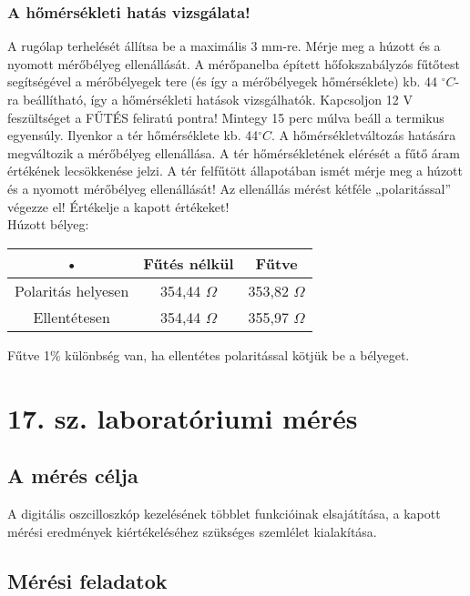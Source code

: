 \documentclass[10pt,a4paper]{article}
\begin{document}
	\subsubsection{A hőmérsékleti hatás vizsgálata!}
	A rugólap terhelését állítsa be a maximális 3 mm-re.
Mérje meg a húzott és a nyomott mérőbélyeg ellenállását.
A mérőpanelba épített hőfokszabályzós fűtőtest segítségével a mérőbélyegek tere (és így a
mérőbélyegek hőmérséklete) kb. 44 $^{\circ}C$-ra beállítható, így a hőmérsékleti hatások
vizsgálhatók.
Kapcsoljon 12 V feszültséget a FŰTÉS feliratú pontra!
Mintegy 15 perc múlva beáll a termikus egyensúly. Ilyenkor a tér hőmérséklete kb. 44$^{\circ}C$.
A hőmérsékletváltozás hatására megváltozik a mérőbélyeg ellenállása.
A tér hőmérsékletének elérését a fűtő áram értékének lecsökkenése jelzi.
A tér felfűtött állapotában ismét mérje meg a húzott és a nyomott mérőbélyeg ellenállását!
Az ellenállás mérést kétféle „polaritással” végezze el! Értékelje a kapott értékeket!
$$$$Húzott bélyeg:$$$$\begin{tabular}{|c|c|c|}
\hline 
• & Fűtés nélkül & Fűtve \\ 
\hline 
Polaritás helyesen & 354,44 $\Omega$ & 353,82 $\Omega$ \\ 
\hline 
Ellentétesen & 354,44 $\Omega$ & 355,97 $\Omega$ \\ 
\hline 
\end{tabular} 
$$$$Fűtve 1$\%$ különbség van, ha ellentétes polaritással kötjük be a bélyeget.

	\section{17. sz. laboratóriumi mérés}
	\subsection{A mérés célja}
	A digitális oszcilloszkóp kezelésének többlet funkcióinak
elsajátítása, a kapott mérési eredmények kiértékeléséhez
szükséges szemlélet kialakítása.
	\subsection{Mérési feladatok}
\end{document}
